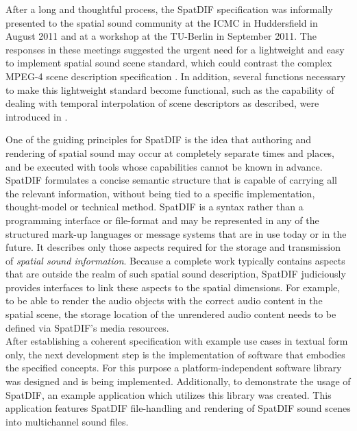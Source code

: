 \documentclass{article}
\begin{document}
After a long and thoughtful process, the SpatDIF specification was informally presented to the spatial sound community at the ICMC in Huddersfield in August 2011 and at a workshop at the TU-Berlin in September 2011.
The responses in these meetings suggested the urgent need for a lightweight and easy to implement spatial sound scene standard, which could contrast the complex MPEG-4 scene description specification \cite{scheirer1999audiobifs}.
In addition, several functions necessary to make this lightweight standard become functional, such as the capability of dealing with temporal interpolation of scene descriptors as described, were introduced in \cite{Peters:2013SpatDifCMJ}.


One of the guiding principles for SpatDIF is the idea that authoring and rendering of spatial sound may occur at completely separate times and places, and be executed with tools whose capabilities cannot be known in advance. 
SpatDIF formulates a concise semantic structure that is capable of carrying all the relevant information, without being tied to a specific implementation, thought-model or technical method. 
SpatDIF is a syntax rather than a programming interface or file-format and may be represented in any of the structured mark-up languages or message systems that are in use today or in the future. 
It describes only those aspects required for the storage and transmission of \emph{spatial sound information}.
Because a complete work typically contains aspects that are outside the realm of such spatial sound description, SpatDIF judiciously provides interfaces to link these aspects to the spatial dimensions.
For example, to be able to render the audio objects with the correct audio content in the spatial scene, the storage location of the unrendered audio content needs to be defined via SpatDIF's media resources.
\\
After establishing a coherent specification with example use cases in textual form only, the next development step is the implementation of software that embodies the specified concepts.
For this purpose a platform-independent software library was designed and is being implemented. 
Additionally, to demonstrate the usage of SpatDIF, an example application which utilizes this library was created. This application features SpatDIF file-handling and  rendering of SpatDIF sound scenes into multichannel sound files.
\end{document}

